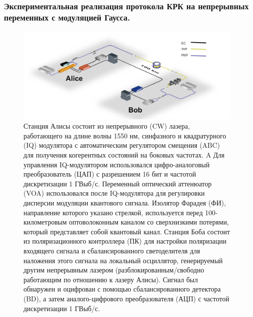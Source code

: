 \subsubsection{Экспериментальная реализация протокола КРК на непрерывных переменных с модуляцией Гаусса.}
\begin{figure}
    \centering
    \includegraphics[width=0.9\linewidth]{images/QKD CV LLO.png}
    \caption{Станция Алисы состоит из непрерывного (CW) лазера, работающего на длине волны 1550 нм, синфазного и квадратурного (IQ) модулятора с автоматическим регулятором смещения (ABC) для получения когерентных состояний на боковых частотах. A Для управления IQ-модулятором использовался цифро-аналоговый преобразователь (ЦАП) с разрешением 16 бит и частотой дискретизации 1 ГВыб/с. Переменный оптический аттенюатор (VOA) использовался после IQ-модулятора для регулировки дисперсии модуляции квантового сигнала. Изолятор Фарадея (ФИ), направление которого указано стрелкой, используется перед 100-километровым оптоволоконным каналом со сверхнизкими потерями, который представляет собой квантовый канал. Станция Боба состоит из поляризационного контроллера (ПК) для настройки поляризации входящего сигнала и сбалансированного светоделителя для наложения этого сигнала на локальный осциллятор, генерируемый другим непрерывным лазером (разблокированным/свободно работающим по отношению к лазеру Алисы). Сигнал был обнаружен и оцифрован с помощью сбалансированного детектора (BD), а затем аналого-цифрового преобразователя (АЦП) с частотой дискретизации 1 ГВыб/с.}
    \label{fig:CV QKD ЛЛО lit}
\end{figure}
